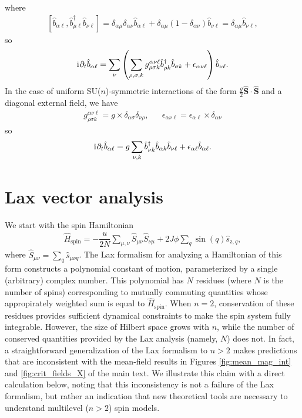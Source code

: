 \documentclass[aps,pra,nofootinbib,twocolumn,superscriptaddress]{revtex4-2}
\newcommand{\f}[2]{\dfrac{#1}{#2}} %
\newcommand{\p}[1]{\left(#1\right)} %
\renewcommand{\sp}[1]{\left[#1\right]} %
\renewcommand{\i}{\mathrm{i}\mkern1mu} %
\newcommand{\1}{\mathds{1}}
\renewcommand{\b}{\hat{b}}
\newcommand{\s}{\hat{s}}
\renewcommand{\H}{\hat{H}}
\renewcommand{\S}{\hat{S}}
\newcommand{\z}{\text{z}}
\newcommand{\spin}{\text{spin}}
\begin{document}
where
\begin{align}
  \sp{\b_{\alpha\ell}, \b_{\mu\ell}^\dag \b_{\nu\ell}}
  = \delta_{\alpha\mu} \delta_{\alpha\nu} \b_{\alpha\ell}
  + \delta_{\alpha\mu} \p{1-\delta_{\alpha\nu}} \b_{\nu\ell}
  = \delta_{\alpha\mu} \b_{\nu\ell},
\end{align}
so
\begin{align}
  \i \partial_t \b_{\alpha\ell}
  = \sum_\nu \p{\sum_{\rho,\sigma,k}
    g^{\alpha\nu\ell}_{\rho\sigma k} \b_{\rho k}^\dag \b_{\sigma k}
    + \epsilon_{\alpha\nu\ell}} \b_{\nu\ell}.
\end{align}
In the case of uniform SU($n$)-symmetric interactions of the form $\frac{g}{2}\bm\S\cdot\bm\S$ and a diagonal external field, we have
\begin{align}
  g^{\alpha\nu\ell}_{\rho\sigma k}
  = g \times \delta_{\alpha\sigma} \delta_{\nu\rho},
  &&
  \epsilon_{\alpha\nu\ell}
  = \epsilon_{\alpha\ell} \times \delta_{\alpha\nu}
\end{align}
so
\begin{align}
  \i \partial_t \b_{\alpha\ell}
  = g \sum_{\nu,k} \b_{\nu k}^\dag \b_{\alpha k} \b_{\nu\ell}
  + \epsilon_{\alpha\ell} \b_{\alpha\ell}.
\end{align}

\section{Lax vector analysis}
\label{sec:lax}

We start with the spin Hamiltonian
\begin{align}
  \H_\spin
  = -\f{u}{2N} \sum_{\mu,\nu} \S_{\mu\nu} \S_{\nu\mu}
  + 2J\phi \sum_q \sin\p{q} \s_{\z,q},
  \label{eq:H_spin_lax}
\end{align}
where $\S_{\mu\nu} = \sum_q \s_{\mu\nu q}$.
The Lax formalism \cite{yuzbashyan2005nonequilibrium, yuzbashyan2006dynamical, yuzbashyan2006relaxation, yuzbashyan2015quantum, smale2019observation} for analyzing a Hamiltonian of this form constructs a polynomial constant of motion, parameterized by a single (arbitrary) complex number.
This polynomial has $N$ residues (where $N$ is the number of spins) corresponding to mutually commuting quantities whose appropirately weighted sum is equal to $\H_\spin$.
When $n=2$, conservation of these residues provides sufficient dynamical constraints to make the spin system fully integrable.
However, the size of Hilbert space grows with $n$, while the number of conserved quantities provided by the Lax analysis (namely, $N$) does not.
In fact, a straightforward generalization of the Lax formalism to $n>2$ makes predictions that are inconsistent with the mean-field results in Figures \ref{fig:mean_mag_int} and \ref{fig:crit_fields_X} of the main text.
We illustrate this claim with a direct calculation below, noting that this inconsistency is not a failure of the Lax formalism, but rather an indication that new theoretical tools are necessary to understand multilevel ($n>2$) spin models.
\end{document}

